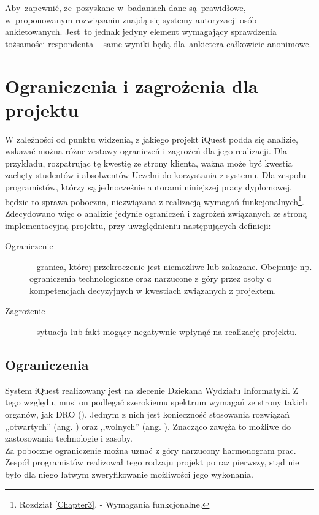 Aby~zapewnić, że~pozyskane w~badaniach dane są~prawidłowe, w~proponowanym rozwiązaniu znajdą się systemy autoryzacji osób ankietowanych. Jest~to jednak jedyny element wymagający sprawdzenia tożsamości respondenta -- same wyniki będą dla~ankietera całkowicie anonimowe.

\section{Ograniczenia i zagrożenia dla projektu}
\label{Chapter12}

W zależności od punktu widzenia, z jakiego projekt iQuest podda się analizie, wskazać można różne zestawy ograniczeń i zagrożeń dla jego realizacji. Dla przykładu, rozpatrując tę kwestię ze strony klienta, ważna może być kwestia zachęty studentów i absolwentów Uczelni do korzystania z systemu. Dla zespołu programistów, którzy są jednocześnie autorami niniejszej pracy dyplomowej, będzie to sprawa poboczna, niezwiązana z realizacją wymagań funkcjonalnych\footnote{Rozdział \ref{Chapter3}. - Wymagania funkcjonalne.}. Zdecydowano więc o analizie jedynie ograniczeń i zagrożeń związanych ze stroną implementacyjną projektu, przy uwzględnieniu następujących definicji:
\begin{description}
\item[Ograniczenie] -- granica, której przekroczenie jest niemożliwe lub zakazane. Obejmuje np. ograniczenia technologiczne oraz narzucone z góry przez osoby o kompetencjach decyzyjnych w kwestiach związanych z projektem.
\item[Zagrożenie] -- sytuacja lub fakt mogący negatywnie wpłynąć na realizację projektu.
\end{description}

\subsection{Ograniczenia}
\label{Chapter121}

System iQuest realizowany jest na zlecenie Dziekana Wydziału Informatyki. Z tego względu, musi on podlegać szerokiemu spektrum wymagań ze strony takich organów, jak DRO (). Jednym z nich jest konieczność stosowania rozwiązań ,,otwartych'' (ang. ) oraz ,,wolnych'' (ang. ). Znacząco zawęża to możliwe do zastosowania technologie i zasoby. \\

Za poboczne ograniczenie można uznać z góry narzucony harmonogram prac. Zespół programistów realizował tego rodzaju projekt po raz pierwszy, stąd nie było dla niego łatwym zweryfikowanie możliwości jego wykonania.

